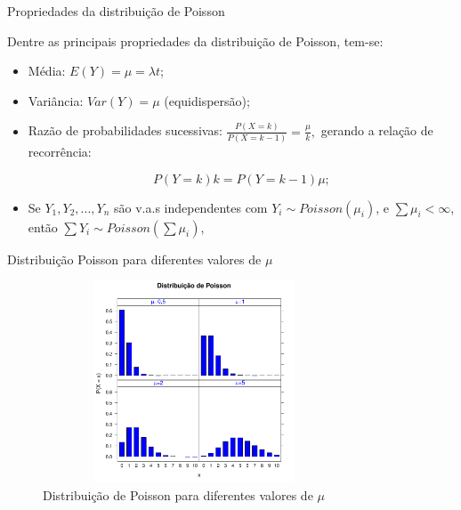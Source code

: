 \documentclass[10pt, aspectratio=169]{beamer}
\begin{document}


\begin{frame}{Propriedades da distribuição de Poisson}

Dentre as principais propriedades da distribuição de Poisson, tem-se:

\vspace{0,3cm}

\begin{itemize}

    \item Média: $E(Y)=\mu = \lambda t$;
    \vspace{0,5cm}
    
    \item Variância: $Var(Y)=\mu$ (equidispersão);
    \vspace{0,5cm}
    
    \item Razão de probabilidades sucessivas: $\frac{P\left ( X=k \right )}{P\left ( X=k-1 \right )}=\frac{\mu}{k},$ gerando a relação de recorrência:
    
    $$
        P(Y=k)k=P(Y=k-1)\mu;
    $$
    
    \item Se $Y_{1},Y_{2},...,Y_{n}$ são v.a.s independentes com $Y_{i}\sim Poisson(\mu_{i})$, e $\sum\mu_{i}<\infty$, então $\sum Y_{i}\sim Poisson(\sum\mu_{i})$,
    
    \end{itemize}
\end{frame}



\begin{frame}{Distribuição Poisson para diferentes valores de $\mu$}
    
    \begin{figure}[h]
    \includegraphics[height=6cm,width=9cm]{images/graf1.pdf}
    \caption{Distribuição de Poisson para diferentes valores de $\mu$}
    \label{Fig1}
    \centering
    
\end{figure}
\end{frame}
\end{document}
